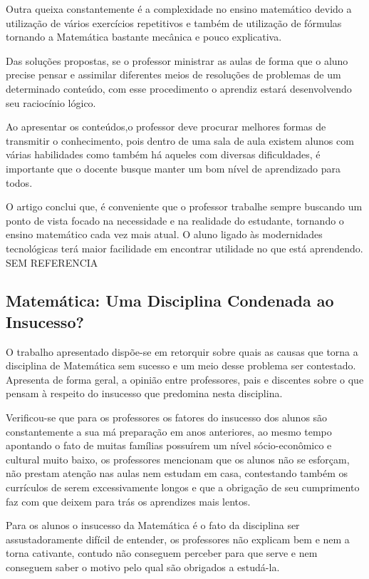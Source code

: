 \documentclass[12pt,a4paper]{article}
\begin{document}
Outra queixa constantemente é a complexidade no ensino matemático devido a utilização de vários exercícios repetitivos e também de utilização de fórmulas tornando a Matemática bastante mecânica e pouco explicativa. 

Das soluções propostas, se o professor ministrar as aulas de forma que o aluno precise pensar e assimilar diferentes meios de resoluções de problemas de um determinado conteúdo, com esse procedimento o aprendiz estará desenvolvendo seu raciocínio lógico.  

Ao apresentar os conteúdos,o professor deve procurar melhores formas de transmitir o conhecimento, pois dentro de uma sala de aula existem alunos com várias habilidades como também há aqueles com diversas dificuldades, é importante que o docente busque manter um bom nível de aprendizado para todos.

O artigo conclui que, é conveniente que o professor trabalhe sempre buscando um ponto de vista focado na necessidade e na realidade do estudante, tornando o ensino matemático cada vez mais atual. O aluno ligado às modernidades tecnológicas terá maior facilidade em encontrar utilidade no que está aprendendo. SEM REFERENCIA

\subsection{Matemática: Uma Disciplina Condenada ao Insucesso?}

O trabalho apresentado dispõe-se em retorquir sobre quais as causas que torna a disciplina de Matemática sem sucesso e um meio desse problema ser contestado. Apresenta de forma geral, a opinião entre professores, pais e discentes sobre o que pensam à respeito do insucesso que predomina nesta disciplina.

Verificou-se que para os professores os fatores do insucesso dos alunos são constantemente a sua má preparação em anos anteriores, ao mesmo tempo apontando o fato de muitas famílias possuírem um nível sócio-econômico e cultural muito baixo, os professores mencionam que os alunos não se esforçam, não prestam atenção nas aulas nem estudam em casa, contestando também os currículos de serem excessivamente longos e que a obrigação de seu cumprimento faz com que deixem para trás os aprendizes  mais lentos. 

Para os alunos o insucesso da Matemática é o fato da disciplina ser assustadoramente difícil de entender, os professores não explicam bem e nem a torna cativante, contudo não conseguem perceber para que serve e nem conseguem saber o motivo pelo qual são obrigados a estudá-la.
\end{document}
